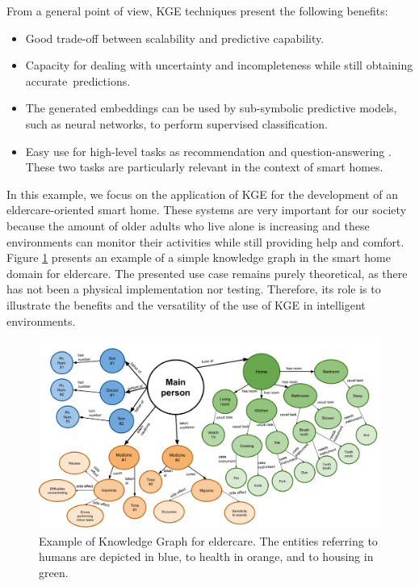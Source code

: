 From a general point of view, KGE techniques present the following benefits:
\begin{itemize}
    \item Good trade-off between scalability and predictive capability.
    \item Capacity for dealing with uncertainty and incompleteness while still obtaining accurate~predictions.
    \item The generated embeddings can be used by sub-symbolic predictive models, such as neural networks, to perform supervised classification.
    \item Easy use for high-level tasks as recommendation \citep{recommendationkge1,recommendationkge2} and question-answering \citep{questionanswering}. These two tasks are particularly relevant in the context of smart homes.

\end{itemize}

In this example, we focus on the application of KGE for the development of an eldercare-oriented smart home. These systems are very important for our society because the amount of older adults who live alone is increasing and these environments can monitor their activities while still providing help and comfort. Figure \ref{fig:example} presents an example of a simple knowledge graph in the smart home domain for eldercare. The presented use case remains purely theoretical, as there has not been a physical implementation nor testing. Therefore, its role is to illustrate the benefits and the versatility of the use of KGE in intelligent environments.
\unskip
\begin{figure}[H]
\centering
\includegraphics[width=\linewidth]{2_stateoftheart/figures/examplegraph.png}
\caption{Example of Knowledge Graph for eldercare. The entities referring to humans are depicted in blue, to health in orange, and to housing in green.  \label{fig:example}}
\end{figure}

